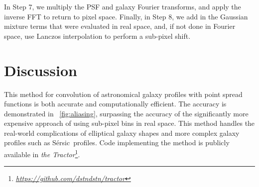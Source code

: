 \documentclass[11pt,letterpaper]{aastex63}
\newcommand{\figref}[1]{\figurename~\ref{#1}}
\newcommand{\Figref}[1]{\figref{#1}}
\newcommand{\niceurl}[1]{\href{#1}{\textsl{#1}}}
\newcommand{\sersic}{S\'ersic}
\begin{document}
In Step 7, we multiply the PSF and galaxy Fourier transforms, and
apply the inverse FFT to return to pixel space.  Finally, in Step 8,
we add in the Gaussian mixture terms that were evaluated in real
space, and, if not done in Fourier space, use Lanczos interpolation to
perform a sub-pixel shift.




% 

\section{Discussion}

This method for convolution of astronomical galaxy profiles with point
spread functions is both accurate and computationally efficient.  The
accuracy is demonstrated in \Figref{fig:aliasing}, surpassing the
accuracy of the significantly more expensive approach of using
sub-pixel bins in real space.  This method handles the real-world
complications of elliptical galaxy shapes and more complex galaxy
profiles such as \sersic\ profiles.  Code implementing the method is
publicly available in \emph{the
  Tractor}\footnote{\niceurl{https://github.com/dstndstn/tractor}}.
\end{document}
